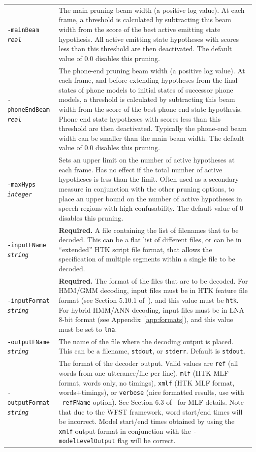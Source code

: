 \documentclass[a4paper,12pt]{report}
\begin{document}
\begin{center}
\begin{longtable}{lp{9cm}}
{\tt -mainBeam \emph{real}} & The main pruning beam width (a positive log value). At each frame, a threshold is calculated by subtracting this beam width from the score of the best active emitting state hypothesis. All active emitting state hypotheses with scores less than this threshold are then deactivated. The default value of $0.0$ disables this pruning. \\
{\tt -phoneEndBeam \emph{real}} & The phone-end pruning beam width (a positive log value). At each frame, and before extending hypotheses from the final states of phone models to initial states of successor phone models, a threshold is calculated by subtracting this beam width from the score of the best phone end state hypothesis. Phone end state hypotheses with scores less than this threshold are then deactivated. Typically the phone-end beam width can be smaller than the main beam width. The default value of $0.0$ disables this pruning. \\
{\tt -maxHyps \emph{integer}} & Sets an upper limit on the number of active hypotheses at each frame. Has no effect if the total number of active hypotheses is less than the limit. Often used as a secondary measure in conjunction with the other pruning options, to place an upper bound on the number of active hypotheses in speech regions with high confusability. The default value of $0$ disables this pruning. \\
{\tt -inputFName \emph{string}} & {\bf Required.} A file containing the list of filenames that to be decoded. This can be a flat list of different files, or can be in ``extended'' HTK script file format, that allows the specification of multiple segments within a single file to be decoded. \\
{\tt -inputFormat \emph{string}} & {\bf Required.} The format of the files that are to be decoded. For HMM/GMM decoding, input files must be in HTK feature file format (see Section $5.10.1$ of~\cite{htkbook321}), and this value must be {\tt htk}. For hybrid HMM/ANN decoding, input files must be in LNA 8-bit format (see Appendix~\ref{app:formats}), and this value must be set to {\tt lna}. \\
{\tt -outputFName \emph{string}} & The name of the file where the decoding output is placed. This can be a filename, {\tt stdout}, or {\tt stderr}. Default is {\tt stdout}. \\
{\tt -outputFormat \emph{string}} & The format of the decoder output. Valid values are {\tt ref} (all words from one utterance/file per line), {\tt mlf} (HTK MLF format, words only, no timings),  {\tt xmlf} (HTK MLF format, words+timings), or {\tt verbose} (nice formatted results, use with {\tt -refFName} option). See Section 6.3 of~\cite{htkbook321} for MLF details. Note that due to the WFST framework, word start/end times will be incorrect. Model start/end times obtained by using the {\tt xmlf} output format in conjunction with the {\tt -modelLevelOutput} flag will be correct. \\

\end{longtable}
\end{center}
\end{document}
